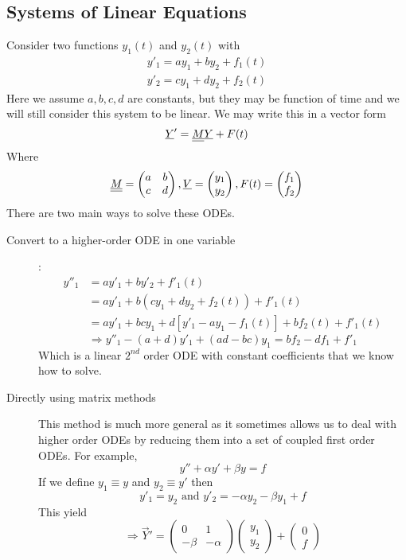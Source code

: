 \documentclass{article}
\begin{document}
\subsection{Systems of Linear Equations}
Consider two functions $y_1(t)$ and $y_2(t)$ with
\begin{align*}
    y'_1 = a y_1 + b y_2 + f_1(t) \\
    y'_2 = c y_1 + d y_2 + f_2(t)
\end{align*}
Here we assume $a, b, c, d$ are constants, but they may be function of time and we will still consider this system to be linear.
We may write this in a vector form
\[
    \underline{Y}' = \underline{\underline{M}} \underline{Y} + F(t)
\]
Where
\[
    \underline{\underline{M}} = \begin{pmatrix}
        a & b \\
        c & d
    \end{pmatrix}, 
    \underline{V} = \begin{pmatrix}
        y_1 \\ y_2
    \end{pmatrix},
    F(t) = \begin{pmatrix}
        f_1 \\ f_2
    \end{pmatrix}
\]
There are two main ways to solve these ODEs.
\begin{description}
    \item[Convert to a higher-order ODE in one variable]:
    \begin{align*}
        y''_1 &= a y'_1 + b y'_2 + f'_1(t) \\
        &= a  y'_1 + b (c y_1 + d y_2 + f_2(t)) + f'_1(t) \\ 
        &= a  y'_1 + bc y_1 + d [ y'_1 - a y_1 - f_1(t)] + bf_2(t) + f'_1(t)
    \end{align*}
    \[
        \Rightarrow y''_1 - (a + d)y'_1 + (ad - bc) y_1 = bf_2 - df_1 + f'_1
    \]
    Which is a linear $2^{nd}$ order ODE with constant coefficients that we know how to solve.

    \item[Directly using matrix methods] This method is much more general as it sometimes allows us to deal with higher order ODEs by reducing them into a set of coupled first order ODEs.
    For example,
    \[
        y'' + \alpha y' + \beta y = f  
    \]
    If we define $y_1 \equiv y$ and $y_2 \equiv y'$ then
    \[
        y'_1 = y_2 \text{ and } y'_2 = - \alpha y_2 - \beta y_1 + f  
    \]
    This yield
    \[
        \Rightarrow \vec Y' = \begin{pmatrix}
            0 & 1 \\
            -\beta & -\alpha
        \end{pmatrix}
        \begin{pmatrix}
            y_1 \\ y_2
        \end{pmatrix}
        + \begin{pmatrix}
            0 \\ f
        \end{pmatrix}
    \]
\end{description}
\end{document}

